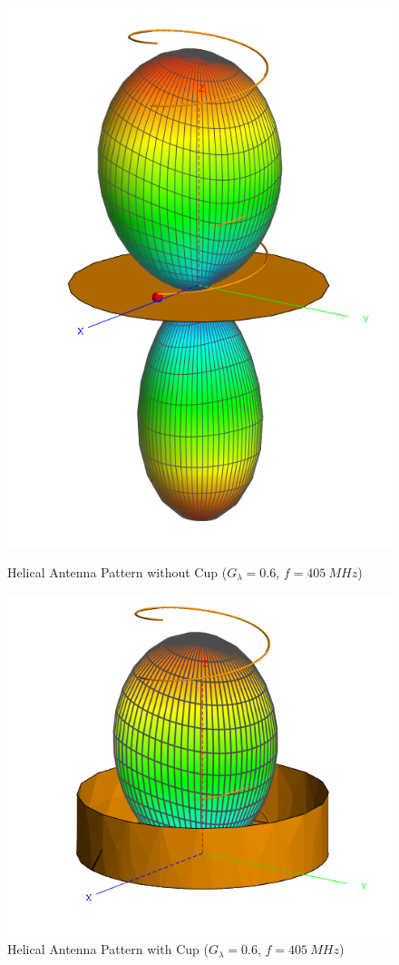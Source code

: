 \begin{figure}[!htb]
  \begin{minipage}{.49\textwidth}
    \centering
    \includegraphics[width=0.5\linewidth]{helix5_pattern_405MHz}
    \caption{Helical Antenna Pattern without Cup ($G_\lambda = 0.6$, $f=\SI{405}{MHz}$)}
    \label{fig:helix5_pattern_405MHz}
  \end{minipage}
  \begin{minipage}{.49\textwidth}
    \centering
    \includegraphics[width=0.75\linewidth]{helix6_pattern_405MHz}
    \caption{Helical Antenna Pattern with Cup ($G_\lambda = 0.6$, $f=\SI{405}{MHz}$)}
    \label{fig:helix6_pattern_405MHz}
  \end{minipage}
\end{figure}


